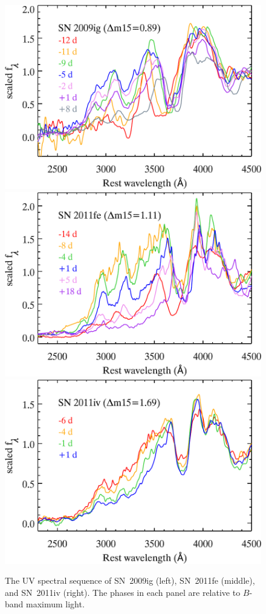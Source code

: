 \documentclass[useAMS,usenatbib]{mn2e}
\begin{document}
\begin{figure}
	\centering
		\includegraphics[scale=0.36]{plot/sn2009ig_all.pdf}
		\includegraphics[scale=0.36]{plot/sn2011fe_all.pdf}
		\includegraphics[scale=0.36]{plot/sn2011iv_all.pdf}
                \caption{The UV spectral sequence of SN~2009ig (left), SN~2011fe (middle), and SN~2011iv (right). The phases in each panel are relative to $B$-band maximum light.}
        \label{uv-evolution}
\end{figure}
\end{document}

